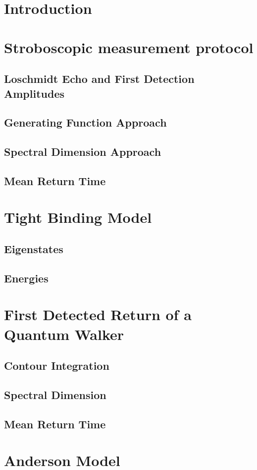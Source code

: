 \documentclass[12pt]{article}
\begin{document}
\tableofcontents
\newpage
\section{Introduction}
\section{Stroboscopic measurement protocol}
\subsection{Loschmidt Echo and First Detection Amplitudes}
\subsection{Generating Function Approach}
\subsection{Spectral Dimension Approach}
\subsection{Mean Return Time}
\section{Tight Binding Model}
\subsection{Eigenstates}
\subsection{Energies}
\section{First Detected Return of a Quantum Walker}
\subsection{Contour Integration}
\subsection{Spectral Dimension}
\subsection{Mean Return Time}
\section{Anderson Model}
\end{document}
